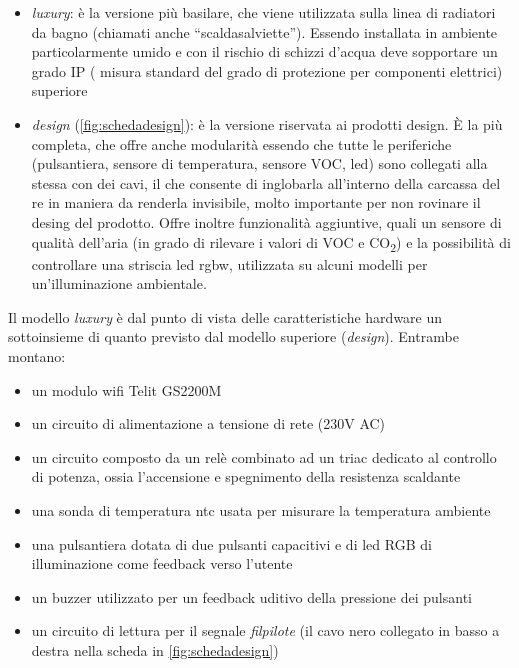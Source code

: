 \documentclass[12pt,a4paper,twoside,titlepage]{book}
\begin{document}
\begin{itemize}
    \item \textit{luxury}: è la versione più basilare, che viene utilizzata sulla linea di
        radiatori da bagno (chiamati anche ``scaldasalviette''). Essendo installata in ambiente 
        particolarmente umido e con il rischio di schizzi d'acqua deve sopportare un grado IP (
        misura standard del grado di protezione per componenti elettrici) superiore
    \item \textit{design} (\autoref{fig:schedadesign}): è la versione riservata ai prodotti design. È la più completa,
        che offre anche modularità essendo che tutte le periferiche (pulsantiera, sensore di temperatura,
        sensore VOC, \acrshort{led}) sono collegati alla stessa con dei cavi, il che consente di inglobarla
        all'interno della carcassa del \acrshort{re} in maniera da renderla invisibile, molto importante per non rovinare 
        il desing del prodotto. Offre inoltre funzionalità aggiuntive, quali un sensore di qualità
        dell'aria (in grado di rilevare i valori di VOC e CO\textsubscript{2}) e la possibilità di
        controllare una striscia \acrshort{led} \Gls{rgbw}, utilizzata su alcuni modelli per un'illuminazione ambientale.
\end{itemize}

Il modello \textit{luxury} è dal punto di vista delle caratteristiche hardware un sottoinsieme di quanto 
previsto dal modello superiore (\textit{design}). Entrambe montano:

\begin{itemize}
    \item un modulo \Gls{wifi} Telit GS2200M
    \item un circuito di alimentazione a tensione di rete (230V AC)
    \item un circuito composto da un relè combinato ad un triac dedicato al controllo di potenza, 
        ossia l'accensione e spegnimento della resistenza scaldante
    \item una sonda di temperatura \Gls{ntc} usata per misurare la temperatura ambiente
    \item una pulsantiera dotata di due pulsanti capacitivi e di \acrshort{led} RGB di illuminazione
        come feedback verso l'utente
    \item un buzzer utilizzato per un feedback uditivo della pressione dei pulsanti
    \item un circuito di lettura per il segnale \textit{\Gls{filpilote}} (il cavo nero collegato 
        in basso a destra nella scheda in \autoref{fig:schedadesign})
\end{itemize}
\end{document}
